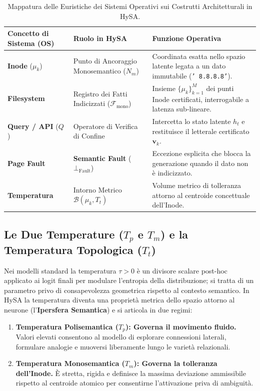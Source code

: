 \documentclass[11pt,a4paper]{article}
\theoremstyle{definition}
\begin{document}
\begin{table}[t]
\centering
\caption{Mappatura delle Euristiche dei Sistemi Operativi sui Costrutti Architetturali in HySA.}
\label{tab:systems_mapping}
\vspace{0.15cm}
\small
\setlength{\tabcolsep}{4.0pt}
\begin{tabular}{@{}p{3.2cm}p{3.8cm}p{8.5cm}@{}}
\toprule
\textbf{Concetto di Sistema (OS)} & \textbf{Ruolo in HySA} & \textbf{Funzione Operativa} \\ \midrule
\textbf{Inode} ($\mu_k$) & Punto di Ancoraggio Monosemantico ($N_m$) & Coordinata esatta nello spazio latente legata a un dato immutabile (\texttt{' 8.8.8.8'}). \\[4pt]
\textbf{Filesystem} & Registro dei Fatti Indicizzati ($\mathcal{F}_{\mathrm{mono}}$) & Insieme $\{\mu_k\}_{k=1}^M$ dei punti Inode certificati, interrogabile a latenza sub-lineare. \\[4pt]
\textbf{Query / API} ($Q$) & Operatore di Verifica di Confine & Intercetta lo stato latente $h_t$ e restituisce il letterale certificato $\mathbf{v}_k$. \\[4pt]
\textbf{Page Fault} & \textbf{Semantic Fault} ($\bot_{\mathrm{Fault}}$) & Eccezione esplicita che blocca la generazione quando il dato non è indicizzato. \\[4pt]
\textbf{Temperatura} & Intorno Metrico $\mathcal{B}(\mu_k, T_t)$ & Volume metrico di tolleranza attorno al centroide concettuale dell'Inode. \\ \bottomrule
\end{tabular}
\end{table}

\subsection{Le Due Temperature \texorpdfstring{($T_p$ e $T_m$)}{(Tp e Tm)} e la Temperatura Topologica \texorpdfstring{($T_t$)}{(Tt)}}

Nei modelli standard la temperatura $\tau > 0$ è un divisore scalare post-hoc applicato ai logit finali per modulare l'entropia della distribuzione; si tratta di un parametro privo di consapevolezza geometrica rispetto al contesto semantico. In HySA la temperatura diventa una proprietà metrica dello spazio attorno al neurone (l'\textbf{Ipersfera Semantica}) e si articola in due regimi:

\begin{enumerate}[leftmargin=*, itemsep=2.0pt]
    \item \textbf{Temperatura Polisemantica ($T_p$): Governa il movimento fluido.} Valori elevati consentono al modello di esplorare connessioni laterali, formulare analogie e muoversi liberamente lungo le varietà relazionali.
    \item \textbf{Temperatura Monosemantica ($T_m$): Governa la tolleranza dell'Inode.} È stretta, rigida e definisce la massima deviazione ammissibile rispetto al centroide atomico per consentirne l'attivazione priva di ambiguità.
\end{enumerate}
\end{document}
